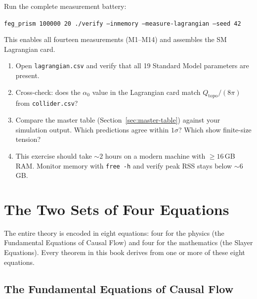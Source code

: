 \documentclass[11pt, a4paper, openany]{book}
\begin{document}
\begin{simulation}
Run the complete measurement battery:

\smallskip
\noindent\texttt{feg\_prism 100000 20 ./verify --inmemory --measure-lagrangian --seed 42}
\smallskip

\noindent This enables all fourteen measurements (M1--M14) and assembles the SM Lagrangian card.
\begin{enumerate}
\item Open \texttt{lagrangian.csv} and verify that all 19 Standard Model parameters are present.
\item Cross-check: does the $\alpha_0$ value in the Lagrangian card match $Q_{\mathrm{topo}}/(8\pi)$ from \texttt{collider.csv}?
\item Compare the master table (Section~\ref{sec:master-table}) against your simulation output. Which predictions agree within $1\sigma$? Which show finite-size tension?
\item This exercise should take $\sim\!2$ hours on a modern machine with $\geq 16$\,GB RAM. Monitor memory with \texttt{free -h} and verify peak RSS stays below $\sim\!6$\,GB.
\end{enumerate}
\end{simulation}


\appendix
\chapter{The Two Sets of Four Equations}\label{app:eight-equations}

The entire theory is encoded in eight equations: four for the physics
(the Fundamental Equations of Causal Flow) and four for the
mathematics (the Slayer Equations). Every theorem in this book derives
from one or more of these eight equations.

\section*{The Fundamental Equations of Causal Flow}
\end{document}
